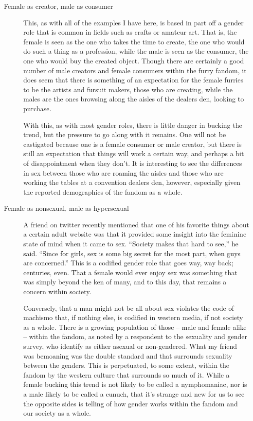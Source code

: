 \begin{description}
  \item[Female as creator, male as consumer]
  This, as with all of the examples I have here, is based in part off a gender role that is common in fields such as crafts or amateur art. That is, the female is seen as the one who takes the time to create, the one who would do such a thing as a profession, while the male is seen as the consumer, the one who would buy the created object. Though there are certainly a good number of male creators and female consumers within the furry fandom, it does seem that there is something of an expectation for the female furries to be the artists and fursuit makers, those who are creating, while the males are the ones browsing along the aisles of the dealers den, looking to purchase.

  With this, as with most gender roles, there is little danger in bucking the trend, but the pressure to go along with it remains. One will not be castigated because one is a female consumer or male creator, but there is still an expectation that things will work a certain way, and perhaps a bit of disappointment when they don’t. It is interesting to see the differences in sex between those who are roaming the aisles and those who are working the tables at a convention dealers den, however, especially given the reported demographics of the fandom as a whole.

  \item[Female as nonsexual, male as hypersexual]
  A friend on twitter recently mentioned that one of his favorite things about a certain adult website was that it provided some insight into the feminine state of mind when it came to sex. ``Society makes that hard to see,'' he said. ``Since for girls, sex is some big secret for the most part, when guys are concerned.'' This is a codified gender role that goes way, way back; centuries, even. That a female would ever enjoy sex was something that was simply beyond the ken of many, and to this day, that remains a concern within society.

  Conversely, that a man might not be all about sex violates the code of machismo that, if nothing else, is codified in western media, if not society as a whole. There is a growing population of those -- male and female alike -- within the fandom, as noted by a respondent to the sexuality and gender survey, who identify as either asexual or non-gendered. What my friend was bemoaning was the double standard and that surrounds sexuality between the genders. This is perpetuated, to some extent, within the fandom by the western culture that surrounds so much of it. While a female bucking this trend is not likely to be called a nymphomaniac, nor is a male likely to be called a eunuch, that it’s strange and new for us to see the opposite sides is telling of how gender works within the fandom and our society as a whole.


\end{description}
